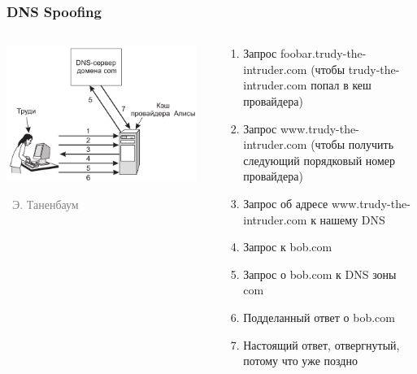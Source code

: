 \documentclass[xetex,mathserif,serif]{beamer}
\newcommand{\attribution}[1] {
\vspace{-5mm}\begin{flushright}\begin{scriptsize}\textcolor{gray}{\textcopyright\, #1}\end{scriptsize}\end{flushright}
}
\begin{document}
    \begin{frame}
        \frametitle{DNS Spoofing}
        \begin{columns}
            \begin{column}{0.4\textwidth}
                \includegraphics[width=0.95\textwidth]{dnsSpoofing.png}
                \attribution{Э. Таненбаум}
            \end{column}
            \begin{column}{0.6\textwidth}
                \begin{footnotesize}
                    \begin{enumerate}
                        \item Запрос foobar.trudy-the-intruder.com (чтобы trudy-the-intruder.com попал в кеш провайдера)
                        \item Запрос www.trudy-the-intruder.com (чтобы получить следующий порядковый номер провайдера)
                        \item Запрос об адресе www.trudy-the-intruder.com к нашему DNS
                        \item Запрос к bob.com
                        \item Запрос о bob.com к DNS зоны com
                        \item Подделанный ответ о bob.com
                        \item Настоящий ответ, отвергнутый, потому что уже поздно
                    \end{enumerate}
                \end{footnotesize}
            \end{column}
        \end{columns}
    \end{frame}
\end{document}

